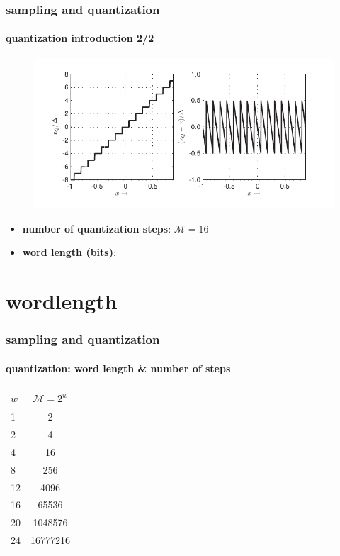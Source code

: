 	\begin{frame}\frametitle{sampling and quantization}\framesubtitle{quantization introduction 2/2}
		\vspace{-4mm}
		\begin{figure}
			\centering
				\includegraphics[trim={0 0 6.6cm 0},clip]{graph/quant}
		\end{figure}
		\vspace{-5mm}
		\begin{itemize}
			\item<2->	\textbf{number of quantization steps}: $\mathcal{M} = 16$
			\item<2->	\textbf{word length (bits)}: \only<3->{$w = \log_2(\mathcal{M}) = \unit[4]{bit}$}
		\end{itemize}
	\end{frame}
	
\section[wordlength]{wordlength}
	\begin{frame}\frametitle{sampling and quantization}\framesubtitle{quantization: word length \& number of steps}
		\begin{table}
			\centering
			\begin{tabular}{lcr}
			\hline
				$w$ & $\mathcal{M} = 2^w$ \\
			\hline
				1	&	2\\
				2	&	4\\
				4	&	16\\
				8	&	256\\
				12	&	4096\\
				16	&	65536\\
				20	&	1048576\\
				24	&	16777216\\
			\end{tabular}  
		\end{table}
	\end{frame}

